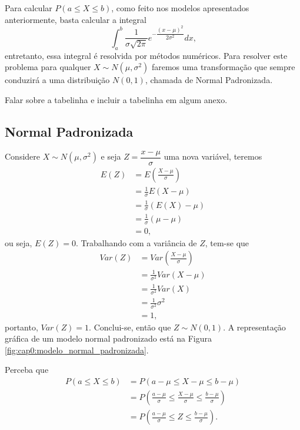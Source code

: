 \documentclass[11pt,fleqn]{book}
\numberwithin{mpicture}{chapter}
\numberwithin{mtable}{chapter}
\numberwithin{mframe}{chapter}
\begin{document}
Para calcular $P(a\leqslant X\leqslant b)$, como feito nos modelos apresentados anteriormente, basta calcular a integral
\[
	\int_{a}^{b}
		\dfrac{1}{\sigma\sqrt{2\pi}}
		e^{
			-\dfrac{(x-\mu)^2}{2\sigma^2}
		}
	dx
	\text{,}
\]
entretanto, essa integral é resolvida por métodos numéricos. Para resolver este problema para qualquer $X\sim N(\mu,\sigma^2)$ faremos uma transformação que sempre conduzirá a uma distribuição $N(0, 1)$, chamada de Normal Padronizada.

{\color{red}Falar sobre a tabelinha e incluir a tabelinha em algum anexo.}

\subsection{Normal Padronizada}

Considere $X\sim N(\mu,\sigma^2)$ e seja $Z=\dfrac{x-\mu}{\sigma}$ uma nova variável, teremos
\begin{align*}
	E(Z)&=E\left(\frac{X-\mu}{\sigma} \right )\\
		&=\frac{1}{\sigma}E(X-\mu)\\
		&=\frac{1}{\sigma}(E(X)-\mu)\\
		&=\frac{1}{\sigma}(\mu-\mu)\\
		&=0\text{,}
\end{align*}
ou seja, $E(Z)=0$. Trabalhando com a variância de $Z$, tem-se que
\begin{align*}
	Var(Z)&=Var\left( \frac{X-\mu}{\sigma} \right )\\
		  &=\frac{1}{\sigma^2}Var(X-\mu)\\
		  &=\frac{1}{\sigma^2}Var(X)\\
		  &=\frac{1}{\sigma^2}\sigma^2\\
		  &=1\text{,}
\end{align*}
portanto, $Var(Z)=1$. Conclui-se, então que $Z\sim N(0,1)$. A representação gráfica de um modelo normal padronizado está na Figura \ref{fig:cap0:modelo_normal_padronizada}.

\begin{remark}
	Perceba que
	\begin{align*}
		P(a\leqslant X \leqslant b)&=P(a-\mu \leqslant X-\mu \leqslant b-\mu)\\
									&=P\left(\frac{a-\mu}{\sigma}\leqslant \frac{X-\mu}{\sigma} \leqslant \frac{b-\mu}{\sigma}\right )\\
									&=P\left(\frac{a-\mu}{\sigma}\leqslant Z \leqslant \frac{b-\mu}{\sigma} \right )\text{.}
	\end{align*}
\end{remark}
\end{document}
